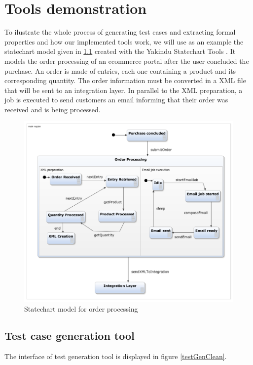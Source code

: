 \chapter{Tools demonstration}
\label{cap:casestudy}

To ilustrate the whole process of generating test cases and extracting formal properties and how our implemented tools work, we will use as an example the statechart model given in \ref{webOrderProc} created with the Yakindu Statechart Tools \cite{Yakindu}. It models the order processing of an ecommerce portal after the user concluded the purchase. An order is made of entries, each one containing a product and its corresponding quantity. The order information must be converted in a XML file that will be sent to an integration layer. In parallel to the XML preparation, a job is executed to send customers an email informing that their order was received and is being processed.

\begin{figure}[htb]
\centering
\includegraphics[width=15cm]{figuras/webOrderProc}
\caption{\label{webOrderProc}Statechart model for order processing}
\end{figure}

\section{Test case generation tool}

The interface of test generation tool is displayed in figure \ref{testGenClean}.

